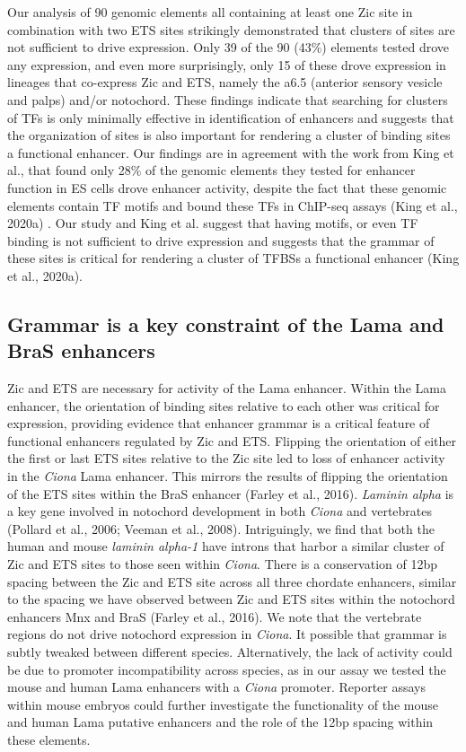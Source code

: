 Our analysis of 90 genomic elements all containing at least one Zic site in combination with two ETS sites strikingly demonstrated that clusters of sites are not sufficient to drive expression. Only 39 of the 90 (43\%) elements tested drove any expression, and even more surprisingly, only 15 of these drove expression in lineages that co-express Zic and ETS, namely the a6.5 (anterior sensory vesicle and palps) and/or notochord. These findings indicate that searching for clusters of TFs is only minimally effective in identification of enhancers and suggests that the organization of sites is also important for rendering a cluster of binding sites a functional enhancer. Our findings are in agreement with the work from King et al., that found only 28\% of the genomic elements they tested for enhancer function in ES cells drove enhancer activity, despite the fact that these genomic elements contain TF motifs and bound these TFs in ChIP-seq assays (King et al., 2020a) . Our study and King et al. suggest that having motifs, or even TF binding is not sufficient to drive expression and suggests that the grammar of these sites is critical for rendering a cluster of TFBSs a functional enhancer (King et al., 2020a). 

\subsection{Grammar is a key constraint of the Lama and BraS enhancers} 

Zic and ETS are necessary for activity of the Lama enhancer. Within the Lama enhancer, the orientation of binding sites relative to each other was critical for expression, providing evidence that enhancer grammar is a critical feature of functional enhancers regulated by Zic and ETS. Flipping the orientation of either the first or last ETS sites relative to the Zic site led to loss of enhancer activity in the \textit{Ciona} Lama enhancer. This mirrors the results of flipping the orientation of the ETS sites within the BraS enhancer (Farley et al., 2016). \textit{Laminin alpha} is a key gene involved in notochord development in both \textit{Ciona} and vertebrates (Pollard et al., 2006; Veeman et al., 2008). Intriguingly, we find that both the human and mouse \textit{laminin alpha-1} have introns that harbor a similar cluster of Zic and ETS sites to those seen within \textit{Ciona}. There is a conservation of 12bp spacing between the Zic and ETS site across all three chordate enhancers, similar to the spacing we have observed between Zic and ETS sites within the notochord enhancers Mnx and BraS (Farley et al., 2016). We note that the vertebrate regions do not drive notochord expression in \textit{Ciona}. It possible that grammar is subtly tweaked between different species. Alternatively, the lack of activity could be due to promoter incompatibility across species, as in our assay we tested the mouse and human Lama enhancers with a \textit{Ciona} promoter. Reporter assays within mouse embryos could further investigate the functionality of the mouse and human Lama putative enhancers and the role of the 12bp spacing within these elements.   

